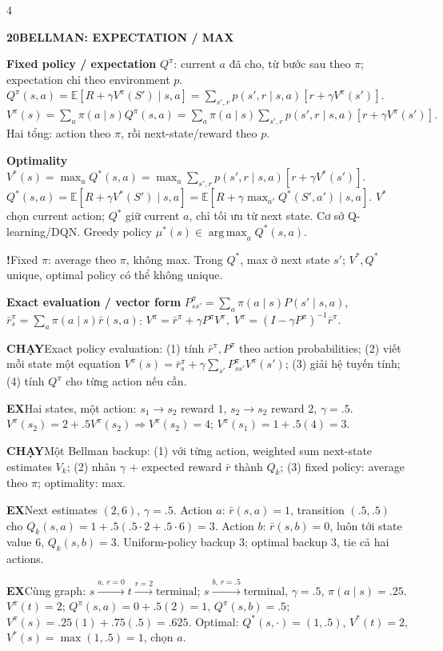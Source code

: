 \documentclass[a4paper]{article}
\newcommand{\topic}[2]{\par\addvspace{.8pt}%
  \begingroup\setlength{\fboxsep}{0.5pt}%
  \noindent\colorbox{structure}{\parbox{\dimexpr\linewidth-2\fboxsep\relax}{%
    \color{white}\fontsize{6.5}{7.1}\selectfont\bfseries #1\enspace #2}}%
  \endgroup\par\nobreak\vspace{.3pt}\nobreak}
\newcommand{\run}[1]{\key{CHẠY}#1}
\newcommand{\key}[1]{\par\textcolor{structure}{\textbf{#1}}\enspace}
\newcommand{\note}[4]{\par\begingroup\setlength{\fboxsep}{0.15pt}%
  \noindent\colorbox{#1}{\parbox{\dimexpr\linewidth-2\fboxsep\relax}{%
    \RaggedRight\textcolor{#2}{\textbf{#3}}\enspace #4}}%
  \endgroup\par}
\newcommand{\trap}[1]{\note{warningbg}{warning}{!}{#1}}
\newcommand{\ex}[1]{\note{examplebg}{example}{EX}{#1}}
\newcommand{\E}{\mathbb{E}}
\newcommand{\argmax}{\operatorname*{arg\,max}}
\begin{document}
\begin{multicols*}{4}
\topic{20}{BELLMAN: EXPECTATION / MAX}
\key{Fixed policy / expectation}
$Q^\pi$: current $a$ đã cho, từ bước sau theo $\pi$; expectation chỉ theo environment $p$.
$Q^\pi(s,a)=\E[R+\gamma V^\pi(S')\mid s,a]=\sum_{s',r}p(s',r\mid s,a)[r+\gamma V^\pi(s')].$
$V^\pi(s)=\sum_a\pi(a\mid s)Q^\pi(s,a)=\sum_a\pi(a\mid s)\sum_{s',r}p(s',r\mid s,a)[r+\gamma V^\pi(s')].$
Hai tổng: action theo $\pi$, rồi next-state/reward theo $p$.
\key{Optimality}
$V^*(s)=\max_aQ^*(s,a)=\max_a\sum_{s',r}p(s',r\mid s,a)[r+\gamma V^*(s')].$
$Q^*(s,a)=\E[R+\gamma V^*(S')\mid s,a]=\E[R+\gamma\max_{a'}Q^*(S',a')\mid s,a].$
$V^*$ chọn current action; $Q^*$ giữ current $a$, chỉ tối ưu từ next state. Cơ sở Q-learning/DQN.
Greedy policy $\mu^*(s)\in\argmax_aQ^*(s,a)$.
\trap{Fixed $\pi$: average theo $\pi$, không max. Trong $Q^*$, max ở next state $s'$; $V^*,Q^*$ unique, optimal policy có thể không unique.}
\key{Exact evaluation / vector form}
$P^\pi_{ss'}=\sum_a\pi(a\mid s)P(s'\mid s,a)$,
$\bar r^\pi_s=\sum_a\pi(a\mid s)\bar r(s,a)$:
$V^\pi=\bar r^\pi+\gamma P^\pi V^\pi,\; V^\pi=(I-\gamma P^\pi)^{-1}\bar r^\pi.$
\run{Exact policy evaluation: (1) tính $\bar r^\pi,P^\pi$ theo action probabilities; (2) viết mỗi state một equation $V^\pi(s)=\bar r_s^\pi+\gamma\sum_{s'}P^\pi_{ss'}V^\pi(s')$; (3) giải hệ tuyến tính; (4) tính $Q^\pi$ cho từng action nếu cần.}
\ex{Hai states, một action: $s_1\to s_2$ reward $1$, $s_2\to s_2$ reward $2$, $\gamma=.5$. $V^\pi(s_2)=2+.5V^\pi(s_2)\Rightarrow V^\pi(s_2)=4$; $V^\pi(s_1)=1+.5(4)=3$.}
\run{Một Bellman backup: (1) với từng action, weighted sum next-state estimates $V_k$; (2) nhân $\gamma$ + expected reward $\bar r$ thành $Q_k$; (3) fixed policy: average theo $\pi$; optimality: max.}
\ex{Next estimates $(2,6)$, $\gamma=.5$. Action $a$: $\bar r(s,a)=1$, transition $(.5,.5)$ cho $Q_k(s,a)=1+.5(.5\cdot2+.5\cdot6)=3$. Action $b$: $\bar r(s,b)=0$, luôn tới state value 6, $Q_k(s,b)=3$. Uniform-policy backup $3$; optimal backup $3$, tie cả hai actions.}
\ex{Cùng graph: $s\xrightarrow{a,\,r=0}t\xrightarrow{r=2}\text{terminal}$; $s\xrightarrow{b,\,r=.5}\text{terminal}$, $\gamma=.5$, $\pi(a\mid s)=.25$. $V^\pi(t)=2$; $Q^\pi(s,a)=0+.5(2)=1$, $Q^\pi(s,b)=.5$; $V^\pi(s)=.25(1)+.75(.5)=.625$. Optimal: $Q^*(s,\cdot)=(1,.5)$, $V^*(t)=2$, $V^*(s)=\max(1,.5)=1$, chọn $a$.}


\end{multicols*}
\end{document}
